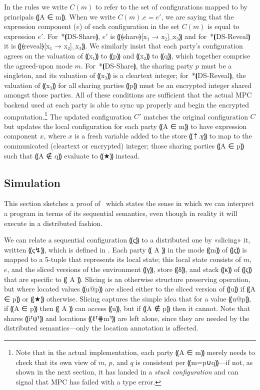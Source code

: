 In the rules we write $C(m)$ to refer to the set of configurations
mapped to by principals ⸨A ∈ m⸩. When we write $C(m).e = e'$, we are
saying that the expression component ($e$) of each configuration in
the set $C(m)$ is equal to expression $e'$. For~*⦗DS-Share⦘, $e'$ is
⸨⦑share⦒[x₁ → x₂]␣x₃⸩ and for~*⦗DS-Reveal⦘ it is ⸨⦑reveal⦒[x₁ →
x₂]␣x₃⸩. We similarly insist that each party's configuration agrees on
the valuation of ⸨x₁⸩ to ⸨p⸩ and ⸨x₂⸩ to ⸨q⸩, which together comprise
the agreed-upon mode $m$. For~*⦗DS-Share⦘, the sharing party $p$ must
be a singleton, and its valuation of ⸨x₃⸩ is a cleartext integer;
for~*⦗DS-Reveal⦘, the valuation of ⸨x₃⸩ for all sharing parties ⸨p⸩
must be an encrypted integer shared amongst those parties. All of
these conditions are sufficient that the actual MPC backend used at
each party is able to sync up properly and begin the encrypted
computation.\footnote{Note that in the actual implementation, each
  party ⸨A ∈ m⸩ merely needs to check that its own view of $m$, $p$,
  and $q$ is consistent per ⸨m=p∪q⸩---if not, as shown in the next
  section, it has landed in a \emph{stuck configuration} and can
  signal that MPC has failed with a type error.} The updated
configuration $C'$ matches the original
configuration $C$ but updates the local configuration for each party
⸨A ∈ m⸩ to have expression component $x$, where $x$ is a fresh
variable added to the store ⸨⇡.γ⸩ to map to the communicated
(cleartext or encrypted) integer; those sharing parties ⸨A ∈ p⸩ such
that ⸨A ∉ q⸩ evaluate to ⸨★⸩ instead.

\subsection{Simulation}
\label{subsec:mpc-design-sim}

This section sketches a proof of~ which states
the sense in which we can interpret a \mpc program in terms of its
sequential semantics, even though in reality it will execute in a
distributed fashion.


We can relate a sequential configuration ⸨ς⸩ to a distributed one by
«slicing» it, written ⸨ς↯⸩, which is defined in . Each
party ⸨ A ⸩ in the mode ⸨m⸩ of ⸨ς⸩ is mapped to a 5-tuple that represents its
local state; this local state consists of $m$, $e$, and the sliced
versions of the environment
⸨γ⸩, store ⸨δ⸩, and stack ⸨κ⸩ of ⸨ς⸩ that are specific to ⸨ A ⸩. Slicing is an
otherwise structure preserving operation, but where located values ⸨u@p⸩ are
sliced either to the sliced version of ⸨u⸩ if ⸨A ∈ p⸩ or ⸨★⸩ otherwise. Slicing
captures the simple idea that for a value ⸨u@p⸩, if ⸨A ∈ p⸩ then ⸨ A ⸩ can
access ⸨u⸩, but if ⸨A ∉ p⸩ then it cannot. Note that
shares ⸨i⸢ψ⸣⸩ and locations ⸨ℓ⸢⋕m⸣⸩ are left alone, since they are
needed by the distributed semantics---only the
location annotation is affected.

